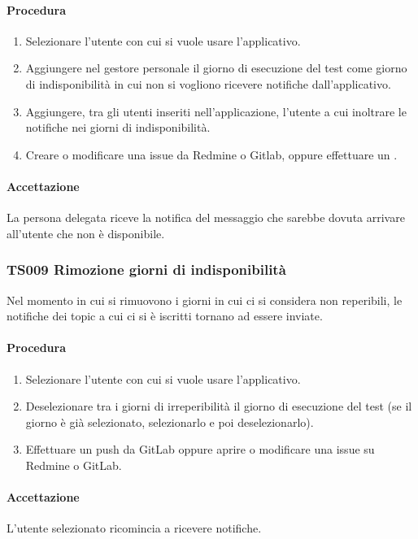 		\paragraph*{Procedura}
			\begin{enumerate}
				\item Selezionare l'utente con cui si vuole usare l'applicativo.
				\item Aggiungere nel gestore personale il giorno di esecuzione del test come giorno di indisponibilità in cui non si vogliono ricevere notifiche dall'applicativo.
				\item Aggiungere, tra gli utenti inseriti nell'applicazione, l'utente a cui inoltrare le notifiche nei giorni di indisponibilità.
				\item Creare o modificare una issue da Redmine o Gitlab, oppure effettuare un . 
			\end{enumerate}
		
		\paragraph*{Accettazione}
		La persona delegata riceve la notifica del messaggio che sarebbe dovuta arrivare all'utente che non è disponibile.
		
	\subsubsection{TS009 Rimozione giorni di indisponibilità}
		Nel momento in cui si rimuovono i giorni in cui ci si considera non reperibili, le notifiche dei topic a cui ci si è iscritti tornano ad essere inviate.
		
		\paragraph*{Procedura}
			\begin{enumerate}
				\item Selezionare l'utente con cui si vuole usare l'applicativo.
				\item Deselezionare tra i giorni di irreperibilità il giorno di esecuzione del test (se il giorno è già selezionato, selezionarlo e poi deselezionarlo).
				\item Effettuare un push da GitLab oppure aprire o modificare una issue su Redmine o GitLab.
			\end{enumerate}
		
		\paragraph*{Accettazione}
		L'utente selezionato ricomincia a ricevere notifiche.


